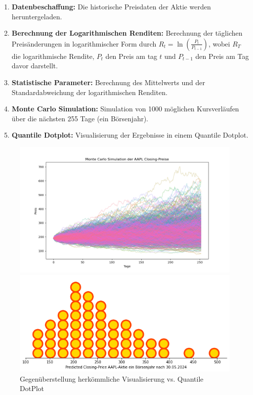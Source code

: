 \begin{enumerate}
\item \textbf{Datenbeschaffung:} Die historische Preisdaten der Aktie werden heruntergeladen.
\item \textbf{Berechnung der Logarithmischen Renditen:} Berechnung der täglichen Preisänderungen in logarithmischer Form durch 
$R_t = \ln\left(\frac{P_t}{P_{t-1}}\right)$, wobei $R_T$ die logarithmische Rendite, $P_t$ den Preis am tag $t$ und $P_{t-1}$ den Preis am Tag davor darstellt.
\item \textbf{Statistische Parameter:} Berechnung des Mittelwerts und der Standardabweichung der logarithmischen Renditen.
\item \textbf{Monte Carlo Simulation:} Simulation von 1000 möglichen Kursverläufen über die nächsten 255 Tage (ein Börsenjahr).
\item \textbf{Quantile Dotplot:} Visualisierung der Ergebnisse in einem Quantile Dotplot.
\end{enumerate}

\begin{figure}[h!]
    \centering
    \begin{minipage}{0.85\textwidth}
        \centering
        \includegraphics[width=\textwidth]{../Bilder/MonteCarloPlot.png}
    \end{minipage}
    \hfill
    \begin{minipage}{0.85\textwidth}
        \centering
        \includegraphics[width=\textwidth]{../Bilder/AAPL_QDP.png}
    \end{minipage}
    \caption{Gegenüberstellung herkömmliche Visualisierung vs. Quantile DotPlot}
    \label{fig:nebeneinander}
\end{figure}

